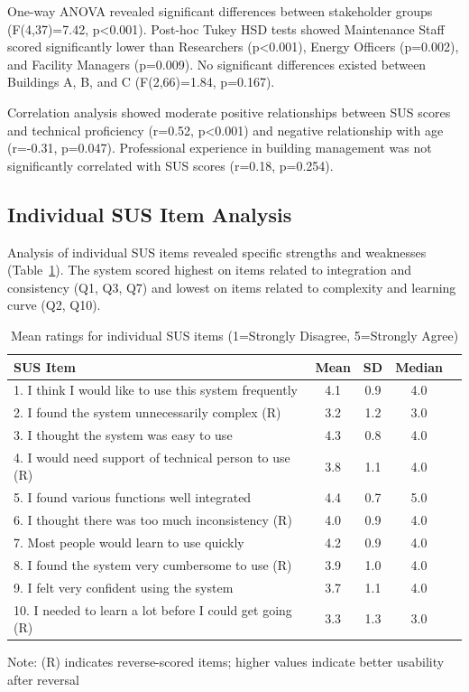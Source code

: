 \documentclass[acmlarge]{acmart}
\begin{document}
One-way ANOVA revealed significant differences between stakeholder groups (F(4,37)=7.42, p<0.001). Post-hoc Tukey HSD tests showed Maintenance Staff scored significantly lower than Researchers (p<0.001), Energy Officers (p=0.002), and Facility Managers (p=0.009). No significant differences existed between Buildings A, B, and C (F(2,66)=1.84, p=0.167).

Correlation analysis showed moderate positive relationships between SUS scores and technical proficiency (r=0.52, p<0.001) and negative relationship with age (r=-0.31, p=0.047). Professional experience in building management was not significantly correlated with SUS scores (r=0.18, p=0.254).

\subsection{Individual SUS Item Analysis}

Analysis of individual SUS items revealed specific strengths and weaknesses (Table~\ref{tab:sus-items}). The system scored highest on items related to integration and consistency (Q1, Q3, Q7) and lowest on items related to complexity and learning curve (Q2, Q10).

\begin{table}[h]
\centering
\begin{threeparttable}
\caption{Mean ratings for individual SUS items (1=Strongly Disagree, 5=Strongly Agree)}
\label{tab:sus-items}
\scriptsize
\begin{tabular}{@{}p{}cccc@{}}
\toprule
\textbf{SUS Item} & \textbf{Mean} & \textbf{SD} & \textbf{Median} \\
\midrule
1. I think I would like to use this system frequently & 4.1 & 0.9 & 4.0 \\
2. I found the system unnecessarily complex (R) & 3.2 & 1.2 & 3.0 \\
3. I thought the system was easy to use & 4.3 & 0.8 & 4.0 \\
4. I would need support of technical person to use (R) & 3.8 & 1.1 & 4.0 \\
5. I found various functions well integrated & 4.4 & 0.7 & 5.0 \\
6. I thought there was too much inconsistency (R) & 4.0 & 0.9 & 4.0 \\
7. Most people would learn to use quickly & 4.2 & 0.9 & 4.0 \\
8. I found the system very cumbersome to use (R) & 3.9 & 1.0 & 4.0 \\
9. I felt very confident using the system & 3.7 & 1.1 & 4.0 \\
10. I needed to learn a lot before I could get going (R) & 3.3 & 1.3 & 3.0 \\
\bottomrule
\end{tabular}
\begin{tablenotes}
\small
\item Note: (R) indicates reverse-scored items; higher values indicate better usability after reversal
\end{tablenotes}
\end{threeparttable}
\end{table}
\end{document}
